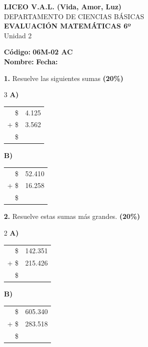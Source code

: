 \documentclass[12pt, letterpaper]{article}
\newcommand{\boxfill}[1][1.5cm]{\tcbox[on line, size=minimal, colframe=black, colback=white, boxrule=0.5pt, arc=1mm, boxsep=3pt, left=2pt, right=2pt, top=2pt, bottom=2pt]{\hspace*{#1}\vphantom{M}}}
\begin{document}
\begin{center}
    {\Large \textbf{LICEO V.A.L. (Vida, Amor, Luz)}}\\[0.1cm]
    {\large DEPARTAMENTO DE CIENCIAS BÁSICAS}\\[0.1cm]
    \textbf{EVALUACIÓN MATEMÁTICAS 6º}\\[0.1cm]
    Unidad 2
\end{center}

\vspace{0.3cm}

\hfill \textbf{Código:} \textbf{06M-02 AC}\\

\noindent \textbf{Nombre:} \underline{\hspace{8cm}} \hspace{1cm}\textbf{Fecha:} \underline{\hspace{3cm}}

\vspace{0.8cm}

\noindent \textbf{1.} Resuelve las siguientes sumas \textbf{(20\%)}

\vspace{0.5cm}
\begin{multicols}{3}
    \textbf{A)}\\
    \begin{tabular}{rr}
      \$ & 4.125 \\
    + \$ & 3.562 \\
    \hline
      \$ & \boxfill[1.5cm]
    \end{tabular}

    \textbf{B)}\\
    \begin{tabular}{rr}
      \$ & 52.410 \\
    + \$ & 16.258 \\
    \hline
      \$ & \boxfill[1.5cm]
    \end{tabular}
\end{multicols}

\vspace{0.8cm}

\noindent \textbf{2.} Resuelve estas sumas más grandes. \textbf{(20\%)}

\vspace{0.5cm}
\begin{multicols}{2}
    \textbf{A)}\\
    \begin{tabular}{rr}
      \$ & 142.351 \\
    + \$ & 215.426 \\
    \hline
      \$ & \boxfill[2.5cm]
    \end{tabular}

    \textbf{B)}\\
    \begin{tabular}{rr}
      \$ & 605.340 \\
    + \$ & 283.518 \\
    \hline
      \$ & \boxfill[2.5cm]
    \end{tabular}
\end{multicols}
\end{document}
